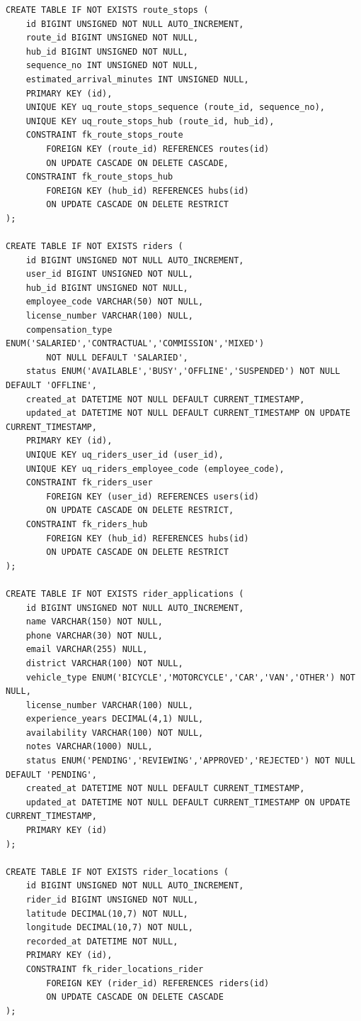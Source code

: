 \documentclass[11pt,a4paper]{article}
\begin{document}
\begin{lstlisting}
CREATE TABLE IF NOT EXISTS route_stops (
    id BIGINT UNSIGNED NOT NULL AUTO_INCREMENT,
    route_id BIGINT UNSIGNED NOT NULL,
    hub_id BIGINT UNSIGNED NOT NULL,
    sequence_no INT UNSIGNED NOT NULL,
    estimated_arrival_minutes INT UNSIGNED NULL,
    PRIMARY KEY (id),
    UNIQUE KEY uq_route_stops_sequence (route_id, sequence_no),
    UNIQUE KEY uq_route_stops_hub (route_id, hub_id),
    CONSTRAINT fk_route_stops_route
        FOREIGN KEY (route_id) REFERENCES routes(id)
        ON UPDATE CASCADE ON DELETE CASCADE,
    CONSTRAINT fk_route_stops_hub
        FOREIGN KEY (hub_id) REFERENCES hubs(id)
        ON UPDATE CASCADE ON DELETE RESTRICT
);

CREATE TABLE IF NOT EXISTS riders (
    id BIGINT UNSIGNED NOT NULL AUTO_INCREMENT,
    user_id BIGINT UNSIGNED NOT NULL,
    hub_id BIGINT UNSIGNED NOT NULL,
    employee_code VARCHAR(50) NOT NULL,
    license_number VARCHAR(100) NULL,
    compensation_type ENUM('SALARIED','CONTRACTUAL','COMMISSION','MIXED')
        NOT NULL DEFAULT 'SALARIED',
    status ENUM('AVAILABLE','BUSY','OFFLINE','SUSPENDED') NOT NULL DEFAULT 'OFFLINE',
    created_at DATETIME NOT NULL DEFAULT CURRENT_TIMESTAMP,
    updated_at DATETIME NOT NULL DEFAULT CURRENT_TIMESTAMP ON UPDATE CURRENT_TIMESTAMP,
    PRIMARY KEY (id),
    UNIQUE KEY uq_riders_user_id (user_id),
    UNIQUE KEY uq_riders_employee_code (employee_code),
    CONSTRAINT fk_riders_user
        FOREIGN KEY (user_id) REFERENCES users(id)
        ON UPDATE CASCADE ON DELETE RESTRICT,
    CONSTRAINT fk_riders_hub
        FOREIGN KEY (hub_id) REFERENCES hubs(id)
        ON UPDATE CASCADE ON DELETE RESTRICT
);

CREATE TABLE IF NOT EXISTS rider_applications (
    id BIGINT UNSIGNED NOT NULL AUTO_INCREMENT,
    name VARCHAR(150) NOT NULL,
    phone VARCHAR(30) NOT NULL,
    email VARCHAR(255) NULL,
    district VARCHAR(100) NOT NULL,
    vehicle_type ENUM('BICYCLE','MOTORCYCLE','CAR','VAN','OTHER') NOT NULL,
    license_number VARCHAR(100) NULL,
    experience_years DECIMAL(4,1) NULL,
    availability VARCHAR(100) NOT NULL,
    notes VARCHAR(1000) NULL,
    status ENUM('PENDING','REVIEWING','APPROVED','REJECTED') NOT NULL DEFAULT 'PENDING',
    created_at DATETIME NOT NULL DEFAULT CURRENT_TIMESTAMP,
    updated_at DATETIME NOT NULL DEFAULT CURRENT_TIMESTAMP ON UPDATE CURRENT_TIMESTAMP,
    PRIMARY KEY (id)
);

CREATE TABLE IF NOT EXISTS rider_locations (
    id BIGINT UNSIGNED NOT NULL AUTO_INCREMENT,
    rider_id BIGINT UNSIGNED NOT NULL,
    latitude DECIMAL(10,7) NOT NULL,
    longitude DECIMAL(10,7) NOT NULL,
    recorded_at DATETIME NOT NULL,
    PRIMARY KEY (id),
    CONSTRAINT fk_rider_locations_rider
        FOREIGN KEY (rider_id) REFERENCES riders(id)
        ON UPDATE CASCADE ON DELETE CASCADE
);


\end{lstlisting}
\end{document}
